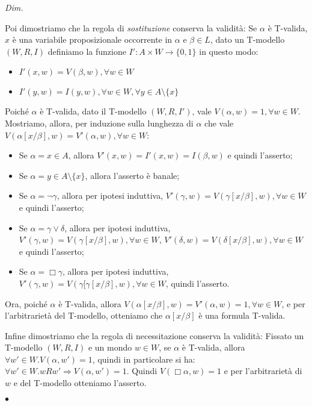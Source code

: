 \documentclass[a4paper, titlepage, 12pt]{report}
\newenvironment{proof}
    {\textit{Dim.}
    }
    {\begin{flushright}$\bullet$\end{flushright}
    }
\begin{document}
\begin{proof}
Poi dimostriamo che la regola di \emph{sostituzione} conserva la validità:
Se $\alpha$ è T-valida, $x$ è una variabile proposizionale occorrente in $\alpha$
e $\beta \in L$, dato un T-modello $(W, R, I)$ definiamo
la funzione $I' : A \times W \to \{0, 1\}$ in questo modo:
\begin{itemize}
    \item $I'(x, w) = V(\beta, w), \forall w \in W$
    \item $I'(y, w) = I(y, w), \forall w \in W, \forall y \in A \setminus \{x\}$
\end{itemize}
Poiché $\alpha$ è T-valida, dato il T-modello $(W, R, I')$, vale
$V(\alpha, w) = 1, \forall w \in W$.
Mostriamo, allora, per induzione sulla lunghezza di $\alpha$ che
vale $V(\alpha[x/\beta], w) = V'(\alpha, w), \forall w \in W$:
\begin{itemize}
\item Se $\alpha = x \in A$, allora $V'(x, w) = I'(x, w) = I(\beta, w)$
      e quindi l'asserto;
\item Se $\alpha = y \in A \setminus \{x\}$, allora l'asserto è banale;
\item Se $\alpha = \neg \gamma$, allora per ipotesi induttiva,
      $V'(\gamma, w) = V(\gamma[x/\beta], w), \forall w \in W$ e quindi l'asserto;
\item Se $\alpha = \gamma \lor \delta$, allora per ipotesi induttiva,
      $V'(\gamma, w) = V(\gamma[x/\beta], w), \forall w \in W$,
      $V'(\delta, w) = V(\delta[x/\beta], w), \forall w \in W$
      e quindi l'asserto;

\item Se $\alpha = \Box \gamma$, allora per ipotesi induttiva,
      $V'(\gamma, w) = V(\gamma[\gamma[x/\beta], w), \forall w \in W$,
      quindi l'asserto.

\end{itemize}

Ora, poiché $\alpha$ è T-valida, allora $V(\alpha[x/\beta], w) = V'(\alpha, w) = 1, \forall w \in W$,
e per l'arbitrarietà del T-modello, otteniamo che $\alpha[x/\beta]$ è una formula T-valida.

Infine dimostriamo che la regola di necessitazione conserva la validità:
Fissato un T-modello $(W, R, I)$ e un mondo $w \in W$,
se $\alpha$ è T-valida, allora $\forall w' \in W.V(\alpha, w') = 1$,
quindi in particolare si ha: $\forall w' \in W. wRw' \Rightarrow V(\alpha, w') = 1$.
Quindi $V(\Box \alpha, w) = 1$ e per l'arbitrarietà di $w$ e del T-modello otteniamo l'asserto.

\end{proof}
\end{document}
